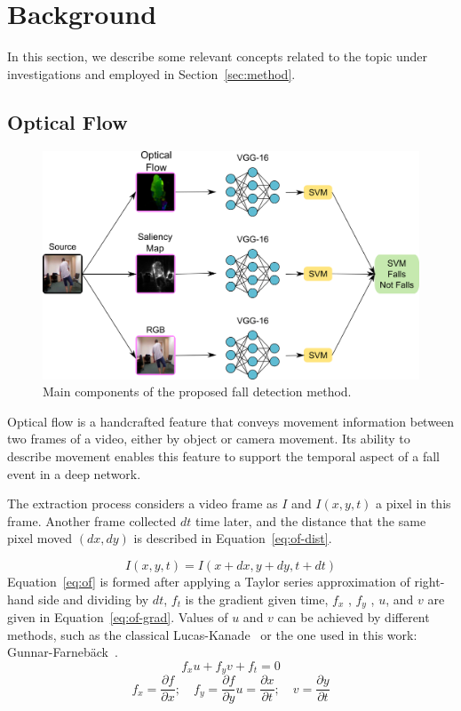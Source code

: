 \documentclass[conference]{IEEEtran}
\begin{document}
\section{Background}
\label{background}

In this section, we describe some relevant concepts related to the topic under investigations and employed in Section~\ref{sec:method}.

\subsection{Optical Flow}
\label{sec:opticalflow}

\begin{figure}[htbp]
\centerline{\includegraphics[width=0.57\linewidth]{figures/overview.png}}
\caption{Main components of the proposed fall detection method.}
\label{fig:overview}
\end{figure}
Optical flow is a handcrafted feature that conveys movement information between two frames of a video, either by object or camera movement. Its ability to describe movement enables this feature to support the temporal aspect of a fall event in a deep network.\par
The extraction process considers a video frame as $I$ and $I(x, y, t)$ a pixel in this frame. Another frame collected $dt$ time later, and the distance that the same pixel moved $(dx, dy)$ is described in Equation~\ref{eq:of-dist}.\par
\begin{equation}
\label{eq:of-dist}
I(x, y, t)=I(x+dx, y+dy, t+dt)
\end{equation}
Equation~\ref{eq:of} is formed after applying a Taylor series approximation of right-hand side and dividing by $dt$, $f_t$ is the gradient given time, $f_x$ , $f_y$ , $u$, and $v$ are given in Equation~\ref{eq:of-grad}. Values of $u$ and $v$ can be achieved by different methods, such as the classical Lucas-Kanade~\cite{jain2018abnormal} or the one used in this work: Gunnar-Farneb\"ack~\cite{lowhur2015dense}.
\begin{equation}
\label{eq:of}
f_xu + f_yv + f_t=0
\end{equation}
\begin{equation}
\label{eq:of-grad}
f_x = \frac{\partial f}{\partial x}; \quad f_y = \frac{\partial f}{\partial y}u = \frac{\partial x}{\partial t}; \quad v = \frac{\partial y}{\partial t}
\end{equation}
\end{document}
